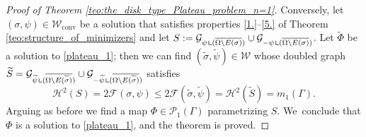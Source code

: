 \documentclass[JEP,XML,SOM,Unicode, NoFloatCountersInSection,published]{cedram}
\let\Om\Omega
\newcommand\admclassconv{{\mathcal W_\mathrm{conv}}}
\newcommand{\resa}{\mathop{\hbox{\vrule height 7pt width 0.5pt depth 0pt
\vrule height 0.5pt width 6pt depth 0pt}}\nolimits}
\newcommand{\resb}{\mathop{\hbox{\vrule height 4pt width 0.5pt depth 0pt
\vrule height 0.5pt width 3pt depth 0pt}}\nolimits}
\newcommand{\res}{\mathchoice{\resa}{\resa}{\resb}{\resb}}
\theoremstyle{definition}
\begin{document}
\begin{proof}[Proof of Theorem \ref{teo:the_disk_type_Plateau_problem_n=1}]
Conversely, let $(\sigma,\psi)\in \admclassconv$ be a solution that
satisfies properties \ref{1.}--\ref{5.} of Theorem \ref{teo:structure_of_minimizers} and let $S:=\mathcal{G}_{\psi\res(\overline{\Om\setminus E(\sigma)})}
\cup \mathcal{G}_{-\psi\res(\overline{\Om\setminus E(\sigma)})}$.
Let $\widetilde\Phi$ be a solution to \eqref{plateau_1}; then we can find $(\widetilde\sigma,\widetilde\psi)\in \mathcal W$ whose
doubled graph $\widetilde S=\mathcal G_{\widetilde\psi\res (\overline{\Om\setminus E(\widetilde\sigma)})}\cup\mathcal G_{-\widetilde\psi\res (\overline{\Om\setminus E(\widetilde\sigma)})}$ satisfies
\[
 \mathcal H^2(S)=2\mathcal F(\sigma,\psi)\leq2\mathcal F(\widetilde\sigma,\widetilde\psi)=\mathcal H^2(\widetilde S)=m_1(\Gamma).
\]
Arguing as before we find a map $\Phi\in \mathcal P_1(\Gamma)$ parametrizing $S$. We~conclude that $\Phi$ is a solution to \eqref{plateau_1}, and the theorem is proved.
\end{proof}
\end{document}
